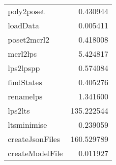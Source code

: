 \begin{tabular}{lr}
\toprule
\midrule
poly2poset & 0.430944 \\
loadData & 0.005411 \\
poset2mcrl2 & 0.418008 \\
mcrl2lps & 5.424817 \\
lps2lpspp & 0.574084 \\
findStates & 0.405276 \\
renamelps & 1.341600 \\
lps2lts & 135.222544 \\
ltsminimise & 0.239059 \\
createJsonFiles & 160.529789 \\
createModelFile & 0.011927 \\
\bottomrule
\end{tabular}

